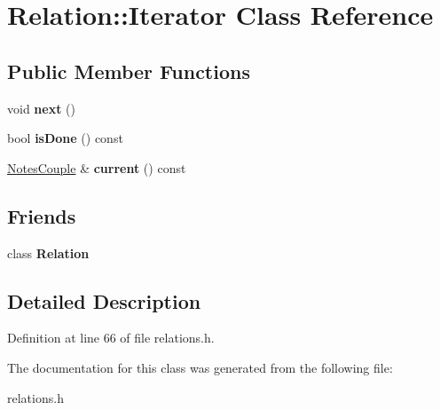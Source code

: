 \hypertarget{class_relation_1_1_iterator}{}\section{Relation\+:\+:Iterator Class Reference}
\label{class_relation_1_1_iterator}
\subsection*{Public Member Functions}
\begin{DoxyCompactItemize}
\item 
\mbox{\label{class_relation_1_1_iterator_a8ff276d2d33755160725b5dbc4a95a72}} 
void {\bfseries next} ()
\item 
\mbox{\label{class_relation_1_1_iterator_ac99e741753998f6c314c3b7884d4dd44}} 
bool {\bfseries is\+Done} () const
\item 
\mbox{\label{class_relation_1_1_iterator_a4d68e76ae0fbe22f025ee747218beb26}} 
\hyperlink{class_notes_couple}{Notes\+Couple} \& {\bfseries current} () const
\end{DoxyCompactItemize}
\subsection*{Friends}
\begin{DoxyCompactItemize}
\item 
\mbox{\label{class_relation_1_1_iterator_a7ee004262f27f8c916688911a71e3aa1}} 
class {\bfseries Relation}
\end{DoxyCompactItemize}


\subsection{Detailed Description}


Definition at line 66 of file relations.\+h.



The documentation for this class was generated from the following file\+:\begin{DoxyCompactItemize}
\item 
relations.\+h\end{DoxyCompactItemize}

